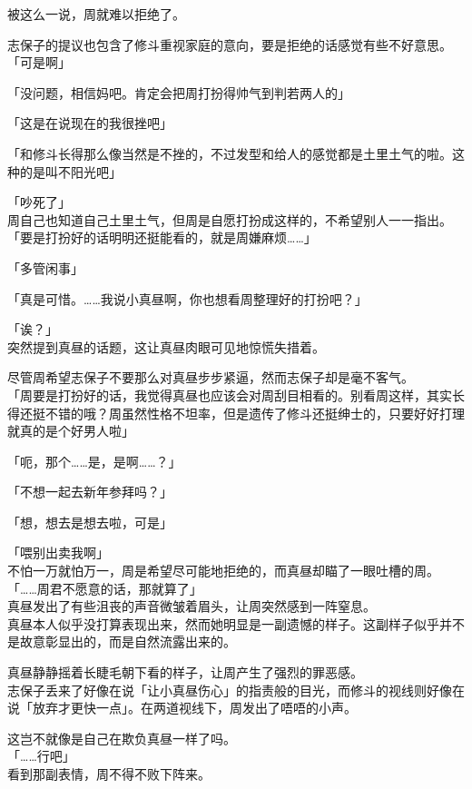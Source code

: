 被这么一说，周就难以拒绝了。

志保子的提议也包含了修斗重视家庭的意向，要是拒绝的话感觉有些不好意思。\\

「可是啊」

「没问题，相信妈吧。肯定会把周打扮得帅气到判若两人的」

「这是在说现在的我很挫吧」

「和修斗长得那么像当然是不挫的，不过发型和给人的感觉都是土里土气的啦。这种的是叫不阳光吧」

「吵死了」\\

周自己也知道自己土里土气，但周是自愿打扮成这样的，不希望别人一一指出。\\

「要是打扮好的话明明还挺能看的，就是周嫌麻烦……」

「多管闲事」

「真是可惜。……我说小真昼啊，你也想看周整理好的打扮吧？」

「诶？」\\

突然提到真昼的话题，这让真昼肉眼可见地惊慌失措着。

尽管周希望志保子不要那么对真昼步步紧逼，然而志保子却是毫不客气。\\

「周要是打扮好的话，我觉得真昼也应该会对周刮目相看的。别看周这样，其实长得还挺不错的哦？周虽然性格不坦率，但是遗传了修斗还挺绅士的，只要好好打理就真的是个好男人啦」

「呃，那个……是，是啊……？」

「不想一起去新年参拜吗？」

「想，想去是想去啦，可是」

「喂别出卖我啊」\\

不怕一万就怕万一，周是希望尽可能地拒绝的，而真昼却瞄了一眼吐槽的周。\\

「……周君不愿意的话，那就算了」\\

真昼发出了有些沮丧的声音微皱着眉头，让周突然感到一阵窒息。\\

真昼本人似乎没打算表现出来，然而她明显是一副遗憾的样子。这副样子似乎并不是故意彰显出的，而是自然流露出来的。

真昼静静摇着长睫毛朝下看的样子，让周产生了强烈的罪恶感。\\

志保子丢来了好像在说「让小真昼伤心」的指责般的目光，而修斗的视线则好像在说「放弃才更快一点」。在两道视线下，周发出了唔唔的小声。

这岂不就像是自己在欺负真昼一样了吗。\\

「……行吧」\\

看到那副表情，周不得不败下阵来。
